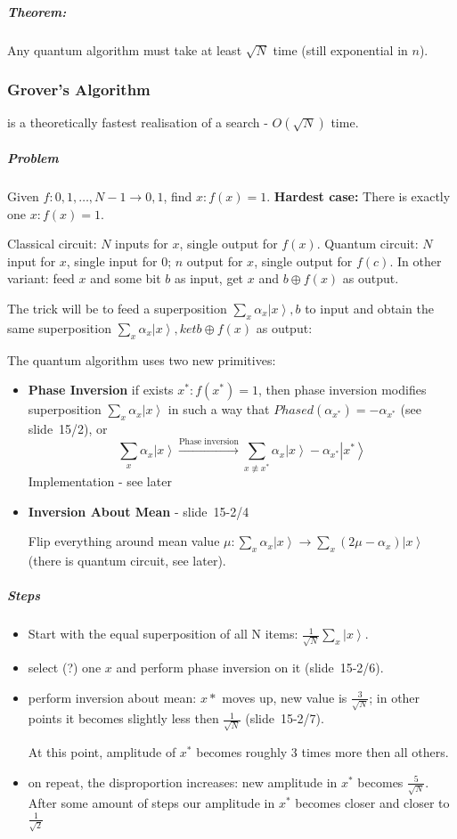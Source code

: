 \documentclass{scrartcl}
\newcommand{\ket}[1]{\left| #1 \right>} %
\newcommand{\slide}[2]{slide~#1/#2} %
\newcommand{\video}[2]{ } %
\begin{document}
\subparagraph{Theorem:} Any quantum algorithm must take at least $\sqrt N$ time
(still exponential in $n$).

\subsubsection{Grover's Algorithm} is a theoretically fastest realisation of a
search - $O(\sqrt N)$ time.

\subparagraph{Problem } Given $f:{0, 1, \dots , N-1} \to {0, 1}$, find $x:f(x) =
1$. {\bf Hardest case:} There is exactly one $x: f(x) = 1$.

Classical circuit: $N$ inputs for $x$, single output for $f(x)$. Quantum
circuit: $N$ input for $x$, single input for $0$; $n$ output for $x$, single
output for $f(c)$. In other variant: feed $x$ and some bit $b$ as input, get $x$
and $b \oplus f(x)$ as output.

The trick will be to feed a superposition $\sum_x \alpha_x \ket x, b$ to input
and obtain the same superposition $\sum_x \alpha_x \ket x, ket {b \oplus f(x)}$
as output:

The quantum algorithm uses two new primitives:
\begin{itemize}
\item {\bf Phase Inversion} if exists $x^*: f(x^*) = 1$, then phase inversion
  modifies superposition $\sum \limits_x \alpha_x \ket x$ in such a way that
  $Phased(\alpha_{x^*}) = - \alpha_{x^*}$ (see \slide{15}2), or
$$\sum_x \alpha_x \ket x \xrightarrow{\text{Phase inversion}} \sum_{x \not
  \equiv x^*}\alpha_x \ket x - \alpha_{x^*}\ket{x^*}$$ Implementation - see
later \video{15-2}{04:00}
\item {\bf Inversion About Mean} - \slide{15-2}4

  Flip everything around mean value $\mu: \sum\limits_x \alpha_x \ket x \to
  \sum\limits_x(2\mu - \alpha_x) \ket x$ (there is quantum circuit, see later).
\end{itemize}

\subparagraph{Steps}
\begin{itemize}
\item Start with the equal superposition of all N items: $\frac1{\sqrt N} \sum_x
  \ket x$.
\item select (?) one $x$ and perform phase inversion on it (\slide{15-2}6).
\item perform inversion about mean: $x*$ moves up, new value is $\frac3{\sqrt
    N}$; in other points it becomes slightly less then $\frac1{\sqrt N}$ (\slide
  {15-2}7).

  At this point, amplitude of $x^*$ becomes roughly 3 times more then all
  others.
\item on repeat, the disproportion increases: new amplitude in $x^*$ becomes
  $\frac5{\sqrt N}$. After some amount of steps our amplitude in $x^*$ becomes
  closer and closer to $\frac1{\sqrt2}$
\end{itemize}
\end{document}
